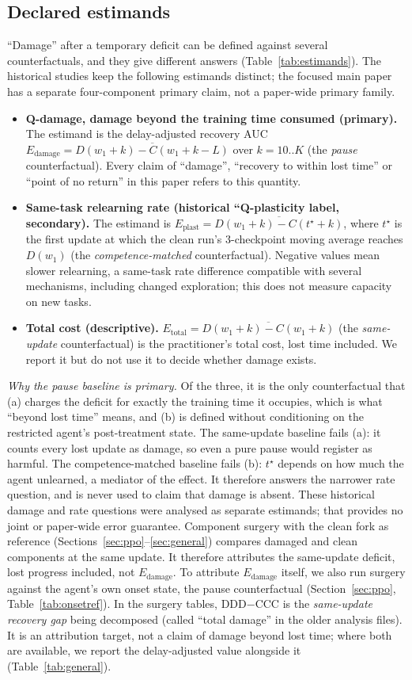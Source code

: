 \documentclass[10pt]{article} %
\begin{document}
\subsection{Declared estimands}\label{sec:estimands}
``Damage'' after a temporary deficit can be defined against several counterfactuals, and they give different answers (Table~\ref{tab:estimands}). The historical studies keep the following estimands distinct; the focused main paper has a separate four-component primary claim, not a paper-wide primary family.
\begin{itemize}
\item \textbf{Q-damage, damage beyond the training time consumed (primary).} The estimand is the delay-adjusted recovery AUC $E_{\mathrm{damage}}=\overline{D(w_1+k)-C(w_1+k-L)}$ over $k=10..K$ (the \emph{pause} counterfactual). Every claim of ``damage'', ``recovery to within lost time'' or ``point of no return'' in this paper refers to this quantity.
\item \textbf{Same-task relearning rate (historical ``Q-plasticity label, secondary).} The estimand is $E_{\mathrm{plast}}=\overline{D(w_1+k)-C(t^\star+k)}$, where $t^\star$ is the first update at which the clean run's 3-checkpoint moving average reaches $D(w_1)$ (the \emph{competence-matched} counterfactual). Negative values mean slower relearning, a same-task rate difference compatible with several mechanisms, including changed exploration; this does not measure capacity on new tasks.
\item \textbf{Total cost (descriptive).} $E_{\mathrm{total}}=\overline{D(w_1+k)-C(w_1+k)}$ (the \emph{same-update} counterfactual) is the practitioner's total cost, lost time included. We report it but do not use it to decide whether damage exists.
\end{itemize}
\emph{Why the pause baseline is primary.} Of the three, it is the only counterfactual that (a) charges the deficit for exactly the training time it occupies, which is what ``beyond lost time'' means, and (b) is defined without conditioning on the restricted agent's post-treatment state. The same-update baseline fails (a): it counts every lost update as damage, so even a pure pause would register as harmful. The competence-matched baseline fails (b): $t^\star$ depends on how much the agent unlearned, a mediator of the effect. It therefore answers the narrower rate question, and is never used to claim that damage is absent. These historical damage and rate questions were analysed as separate estimands; that provides no joint or paper-wide error guarantee. Component surgery with the clean fork as reference (Sections~\ref{sec:ppo}--\ref{sec:general}) compares damaged and clean components at the same update. It therefore attributes the same-update deficit, lost progress included, not $E_{\mathrm{damage}}$. To attribute $E_{\mathrm{damage}}$ itself, we also run surgery against the agent's own onset state, the pause counterfactual (Section~\ref{sec:ppo}, Table~\ref{tab:onsetref}). In the surgery tables, DDD$-$CCC is the \emph{same-update recovery gap} being decomposed (called ``total damage'' in the older analysis files). It is an attribution target, not a claim of damage beyond lost time; where both are available, we report the delay-adjusted value alongside it (Table~\ref{tab:general}).
\end{document}

